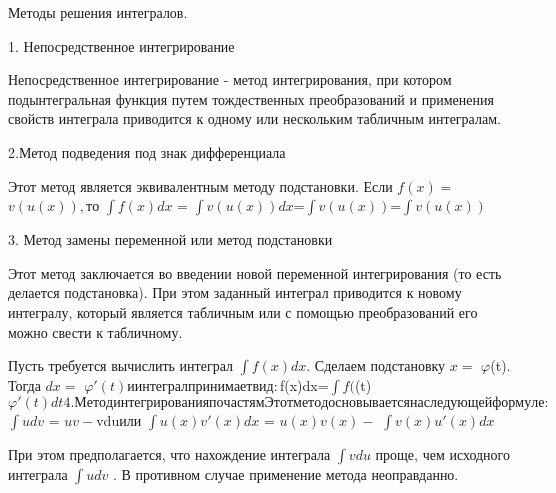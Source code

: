 \documentclass[12pt]{article}
\begin{document}
   	Методы решения интегралов.
   	
   	1. Непосредственное интегрирование
   	
   	Непосредственное интегрирование - метод интегрирования, при котором подынтегральная функция путем тождественных преобразований и применения свойств интеграла приводится к одному или нескольким табличным интегралам.
   	
   	2.Метод подведения под знак дифференциала
   	
   	Этот метод является эквивалентным методу подстановки. Если $f(x) = $$v(u(x)), то 
   	
  $ 	$\displaystyle\int f(x) dx$ = $\displaystyle\int v(u(x)) dx$\cdot {}=$\displaystyle\int v(u(x))$\cdot{}=$\displaystyle\int v(u(x))$
   	\cdot{} 
   	
   	3. Метод замены переменной или метод подстановки
   	
   Этот метод заключается во введении новой переменной интегрирования (то есть делается подстановка). При этом заданный интеграл приводится к новому интегралу, который является табличным или с помощью преобразований его можно свести к табличному. 
   	
   	Пусть требуется вычислить интеграл $\textstyle\int f(x)dx$. Сделаем подстановку $x=$ $\varphi$(t). Тогда $dx=$ $\varphi'(t) и интеграл принимает вид:
   	
   	$\displaystyle\int f(x)dx=$\displaystyle\int f($\varphi(t)\cdot$\varphi'(t)dt
   	
   	4.Метод интегрирования по частям
   	
   	Этот метод основывается на следующей формуле:
   	
    $	$\displaystyle\int udv$ = $ uv - $\displaystyle\int vdu$
   
   
   	или
   	
   	
   $	$\displaystyle\int u(x)v'(x)dx$ = $ u(x)v(x)-$ $\displaystyle\int v(x)u'(x)dx$
   	
   	При этом предполагается, что нахождение интеграла $\textstyle\int vdu$ проще, чем исходного интеграла $\textstyle\int udv$ . В противном случае применение метода неоправданно. 
   	
	
\end{document}
